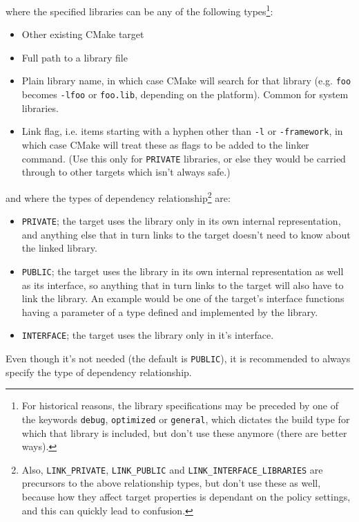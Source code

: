\documentclass[8pt, table, xcdraw]{article}%
\begin{document}
where the specified libraries can be any of the following types\footnote{For historical reasons, the library specifications may be preceded by one of the keywords \lstinline{debug}, \lstinline{optimized} or \lstinline{general}, which dictates the build type for which that library is included, but don't use these anymore (there are better ways).}:

\begin{itemize}
    \item Other existing CMake target
    \item Full path to a library file
    \item Plain library name, in which case CMake will search for that library (e.g. \lstinline{foo} becomes \lstinline{-lfoo} or \lstinline{foo.lib}, depending on the platform). Common for system libraries.
    \item Link flag, i.e. items starting with a hyphen other than \lstinline{-l} or \lstinline{-framework}, in which case CMake will treat these as flags to be added to the linker command. (Use this only for \lstinline{PRIVATE} libraries, or else they would be carried through to other targets which isn't always safe.)
\end{itemize}

and where the types of dependency relationship\footnote{Also, \lstinline{LINK_PRIVATE}, \lstinline{LINK_PUBLIC} and \lstinline{LINK_INTERFACE_LIBRARIES} are precursors to the above relationship types, but don't use these as well, because how they affect target properties is dependant on the policy settings, and this can quickly lead to confusion.} are:

\begin{itemize}
    \item \lstinline{PRIVATE}; the target uses the library only in its own internal representation, and anything else that in turn links to the target doesn't need to know about the linked library.
    \item \lstinline{PUBLIC}; the target uses the library in its own internal representation as well as its interface, so anything that in turn links to the target will also have to link the library. An example would be one of the target's interface functions having a parameter of a type defined and implemented by the library.
    \item \lstinline{INTERFACE}; the target uses the library only in it's interface.
\end{itemize}

Even though it's not needed (the default is \lstinline{PUBLIC}), it is recommended to always specify the type of dependency relationship.
\end{document}
